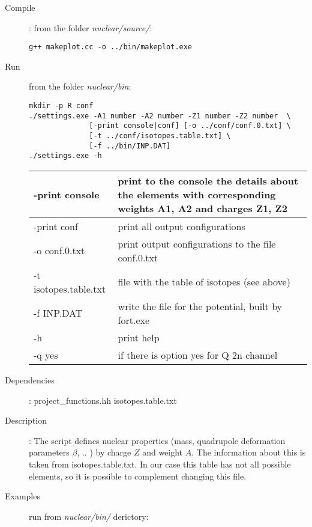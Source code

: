 \documentclass[preprint,review,12pt]{elsarticle}
\begin{document}
    \begin{description}
       \item[Compile]:  from the folder \textit{nuclear/source/}:  
        \begin{verbatim}
g++ makeplot.cc -o ../bin/makeplot.exe

        \end{verbatim}
       \item[Run] from the folder \textit{nuclear/bin}:
        \begin{verbatim}
mkdir -p R conf 
./settings.exe -A1 number -A2 number -Z1 number -Z2 number  \
              [-print console|conf] [-o ../conf/conf.0.txt] \
              [-t ../conf/isotopes.table.txt] \
              [-f ../bin/INP.DAT]
./settings.exe -h
        \end{verbatim}
          \begin{center}
              \begin{tabular}{ | l | p{10cm} |}
              \hline
              -print console   & print to the console the details about the elements with corresponding weights A1, A2 and charges  Z1, Z2 \\ \hline
              -print conf      & print all output configurations   \\ \hline
              -o conf.0.txt    & print output configurations to the file conf.0.txt \\ \hline
              -t isotopes.table.txt  & file with the table of isotopes (see above) \\ \hline
              -f INP.DAT       & write the file for the potential, built by fort.exe  \\ \hline
              -h               & print help  \\ \hline
              -q yes           & if there is option yes for Q 2n channel  \\ \hline
              \end{tabular}
          \end{center}   
       \item [Dependencies]:
           \subitem   project\_functions.hh
           \subitem   isotopes.table.txt 
       \item [Description]: The script defines nuclear properties (mass, quadrupole deformation parameters $\beta$, .. ) by charge $Z$ and weight $A$. The information about this is taken from isotopes.table.txt. In our case this table has not all possible elements, so it is possible to complement changing this file.
       \item [Examples] run from \textit{nuclear/bin/} derictory:

\end{description}
\end{document}
